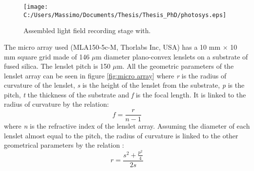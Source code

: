 \begin{figure}[H]
	\centering
	\texttt{[image: C:/Users/Massimo/Documents/Thesis/Thesis\_PhD/photosys.eps]}
	\caption{\label{fig:photo} Assembled light field recording stage with. }
\end{figure}
The micro array used (MLA150-5c-M, Thorlabs Inc, USA) has a 10 mm $\times$ 10 mm square grid made of 146 $\mu$m diameter plano-convex lenslets on a substrate of fused silica. The lenslet pitch is 150 $\mu$m. All the geometric parameters of the lenslet array can be seen in figure \ref{fig:micro array} where \textit{r} is the radius of curvature of the lenslet, \textit{s} is the height of the lenslet from the substrate, \textit{p} is the pitch, \textit{t} the thickness of the substrate and \textit{f} is the focal length. It is linked to the radius of curvature by the relation:
\begin{equation}
	\label{eq:f_micro}
		f = \dfrac{r}{n-1}
\end{equation} 
where \textit{n} is the refractive index of the lenslet array.
Assuming the diameter of each lenslet almost equal to the pitch, the radius of curvature is linked to the other geometrical parameters by the relation \cite{herzig1997micro}: 
\begin{equation}
\label{eq:r_micro}
r = \dfrac{s^2+\frac{p^2}{4}}{2s}
\end{equation} 

